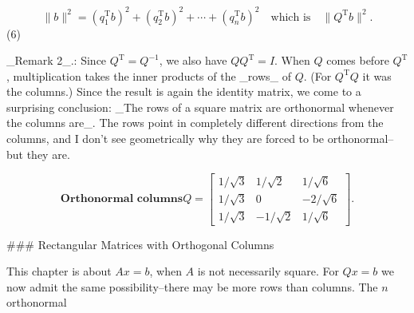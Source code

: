 \[\|b\|^{2}=(q_{1}^{\mathrm{T}}b)^{2}+(q_{2}^{\mathrm{T}}b)^{2}+\cdots+(q_{n}^{ \mathrm{T}}b)^{2}\quad\text{which is}\quad\|Q^{\mathrm{T}}b\|^{2}.\] (6)

_Remark 2_.: Since \(Q^{\mathrm{T}}=Q^{-1}\), we also have \(QQ^{\mathrm{T}}=I\). When \(Q\) comes before \(Q^{\mathrm{T}}\), multiplication takes the inner products of the _rows_ of \(Q\). (For \(Q^{\mathrm{T}}Q\) it was the columns.) Since the result is again the identity matrix, we come to a surprising conclusion: _The rows of a square matrix are orthonormal whenever the columns are_. The rows point in completely different directions from the columns, and I don't see geometrically why they are forced to be orthonormal--but they are.

\[\textbf{{Orthonormal columns}}Q=\begin{bmatrix}1/\sqrt{3}&1/\sqrt{2}&1/\sqrt{6}\\ 1/\sqrt{3}&0&-2/\sqrt{6}\\ 1/\sqrt{3}&-1/\sqrt{2}&1/\sqrt{6}\end{bmatrix}.\]

### Rectangular Matrices with Orthogonal Columns

This chapter is about \(Ax=b\), when \(A\) is not necessarily square. For \(Qx=b\) we now admit the same possibility--there may be more rows than columns. The \(n\) orthonormal 